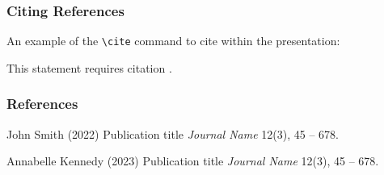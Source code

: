 \documentclass[
	11pt, %
	aspectratio=169, %
]{beamer}
\begin{document}
\begin{frame}
	\frametitle{Citing References}
	
	An example of the \texttt{\textbackslash cite} command to cite within the presentation:
	
	\bigskip %
	
	This statement requires citation \cite{p1,p2}.
\end{frame}


\begin{frame} %
	\frametitle{References}
	
	\begin{thebibliography}{99} %
		\footnotesize %
		
			John Smith (2022)
			\newblock Publication title
			\newblock \emph{Journal Name} 12(3), 45 -- 678.
			
			Annabelle Kennedy (2023)
			\newblock Publication title
			\newblock \emph{Journal Name} 12(3), 45 -- 678.
	\end{thebibliography}
\end{frame}

\end{document}
